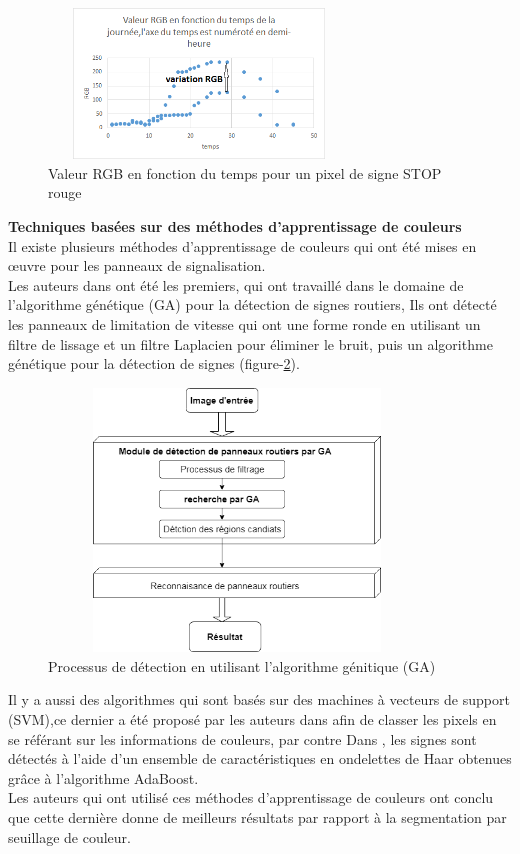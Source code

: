 \begin{figure}[h]
      \centering
    \includegraphics[width=8cm,height=4cm]{images/rgb.png}
    \caption{Valeur RGB en fonction du temps pour un pixel de signe STOP rouge \cite{15} }
    \label{fig:val rgb}
\end{figure}
{\textbf{Techniques basées sur des méthodes d'apprentissage de couleurs}}\\

Il existe plusieurs méthodes d'apprentissage de couleurs qui ont été mises en œuvre pour les panneaux de signalisation.\\
Les auteurs dans \cite{16} ont été les premiers, qui ont travaillé dans le domaine de l'algorithme génétique (GA) pour la détection de signes routiers, Ils ont détecté les panneaux de limitation de vitesse qui ont une forme ronde en utilisant un filtre de lissage et un filtre Laplacien pour éliminer le bruit, puis un algorithme génétique pour la détection de signes (figure-\ref{fig:GA}).\\

\begin{figure}[h]
      \centering
      \includegraphics[width=10cm,height=7cm]{images/uu.png}
    \caption{Processus de détection en utilisant l'algorithme génitique (GA)\cite{16} }
    \label{fig:GA}
\end{figure}

Il y a aussi des algorithmes qui sont basés sur des machines à vecteurs de support (SVM),ce dernier a été proposé par les auteurs dans \cite{17} afin de classer les pixels en se référant sur les informations de couleurs, par contre Dans \cite{18}, les signes sont détectés à l'aide d'un ensemble de caractéristiques en ondelettes de Haar obtenues grâce à l'algorithme AdaBoost.\\
Les auteurs qui ont utilisé ces méthodes d’apprentissage de couleurs  ont conclu que cette dernière donne de meilleurs résultats par rapport à la segmentation par seuillage de couleur.
